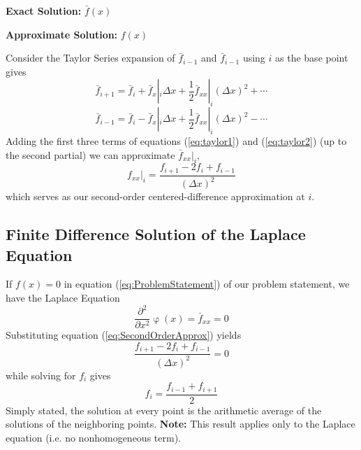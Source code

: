\documentclass[../main.tex]{subfiles}
\begin{document}
\vspace{1em}
\noindent\textbf{Exact Solution:} $\bar{f}(x)$

\noindent\textbf{Approximate Solution:} $f(x)$

\vspace{1em}
\noindent Consider the Taylor Series expansion of $\bar{f}_{i-1}$ and $\bar{f}_{i-1}$ using $i$ as the base point gives
\begin{equation}\label{eq:taylor1}
\bar{f}_{i+1} = \bar{f}_i+\bar{f}_x|_i\Delta x + \frac{1}{2}\bar{f}_{xx}|_i(\Delta x)^2 +\cdots
\end{equation}
\begin{equation}\label{eq:taylor2}
\bar{f}_{i-1} = \bar{f}_i-\bar{f}_x|_i\Delta x + \frac{1}{2}\bar{f}_{xx}|_i(\Delta x)^2 -\cdots
\end{equation}
Adding the first three terms of equations (\ref{eq:taylor1}) and (\ref{eq:taylor2}) (up to the second partial) we can approximate $\bar{f}_{xx}|_i$,
\begin{equation}\label{eq:SecondOrderApprox}
f_{xx}|_i= \frac{f_{i+1} - 2f_i + f_{i-1}}{(\Delta x)^2}
\end{equation}
which serves as our second-order centered-difference approximation at $i$.

\subsection{Finite Difference Solution of the Laplace Equation}
If $f(x) = 0$ in equation (\ref{eq:ProblemStatement}) of our problem statement, we have the Laplace Equation
\begin{equation}\label{eq:Laplace}
\frac{\partial^2}{\partial x^2}\upvarphi(x) = \bar{f}_{xx} = 0
\end{equation}
Substituting equation (\ref{eq:SecondOrderApprox}) yields
\begin{equation}\label{eq:Laplace2}
\frac{f_{i+1} - 2f_i + f_{i-1}}{(\Delta x)^2} = 0
\end{equation}
while solving for $f_i$ gives
\begin{equation}\label{eq:Laplace3}
f_i = \frac{f_{i-1}+f_{i+1}}{2}
\end{equation}
Simply stated, the solution at every point is the arithmetic average of the solutions of the neighboring points. \textbf{Note:} This result applies only to the Laplace equation (i.e. no nonhomogeneous term). 
\end{document}
